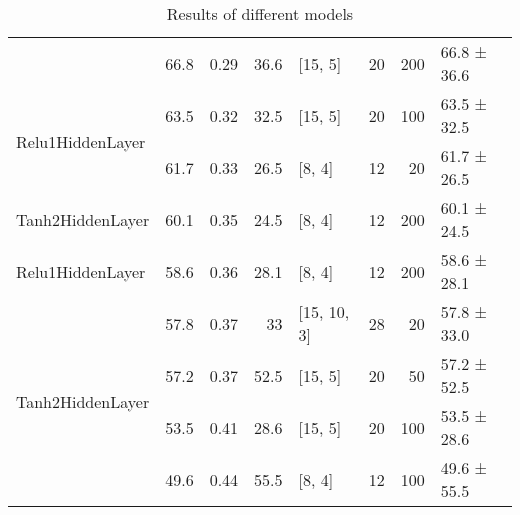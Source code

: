 \begin{table*}
\begin{tabular}{lrrrlrrl}
                                   & 66.8 &  0.29 &     36.6 & [15, 5]        &         20 &      200 & 66.8 ± 36.6 \\
 \multirow{2}{*}{Relu1HiddenLayer} & 63.5 &  0.32 &     32.5 & [15, 5]        &         20 &      100 & 63.5 ± 32.5 \\
                                   & 61.7 &  0.33 &     26.5 & [8, 4]         &         12 &       20 & 61.7 ± 26.5 \\
 Tanh2HiddenLayer                  & 60.1 &  0.35 &     24.5 & [8, 4]         &         12 &      200 & 60.1 ± 24.5 \\
 Relu1HiddenLayer                  & 58.6 &  0.36 &     28.1 & [8, 4]         &         12 &      200 & 58.6 ± 28.1 \\
 \multirow{4}{*}{Tanh2HiddenLayer} & 57.8 &  0.37 &     33   & [15, 10, 3]    &         28 &       20 & 57.8 ± 33.0 \\
                                   & 57.2 &  0.37 &     52.5 & [15, 5]        &         20 &       50 & 57.2 ± 52.5 \\
                                   & 53.5 &  0.41 &     28.6 & [15, 5]        &         20 &      100 & 53.5 ± 28.6 \\
                                   & 49.6 &  0.44 &     55.5 & [8, 4]         &         12 &      100 & 49.6 ± 55.5 \\
\hline
\end{tabular}
        \caption{Results of different models}
        \label{models}
    \end{table*}
    
